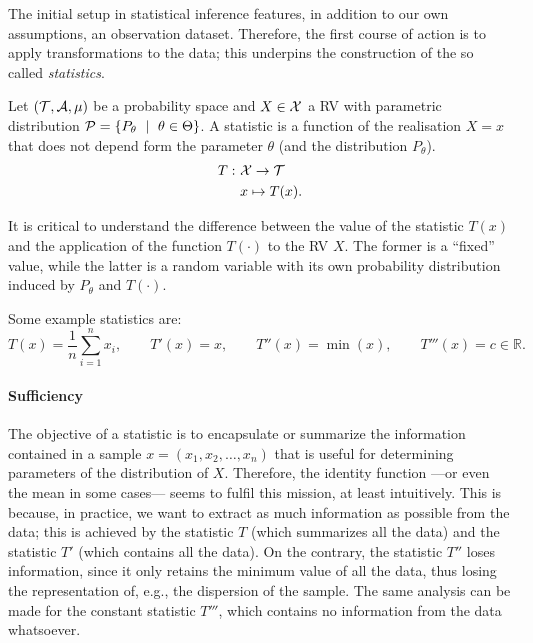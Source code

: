 The initial setup in statistical inference features, in addition to our own assumptions, an observation dataset. Therefore, the first course of action is to apply transformations to the data; this underpins the construction of the so called \emph{statistics}. 


\begin{definition}[Statistic]
\label{def:estadístico}
Let $({\mathcal T},{\mathcal A},\mu)$ be a probability space and $X\in{\mathcal X}$ a RV with parametric distribution $\cP = \{P_\theta\ \mid\ \theta\in\Theta\}$. A statistic is a function of the realisation $X=x$ that does not depend form the parameter $\theta$ (and the distribution $P_\theta$).
\begin{align}
\nonumber
	T:\ &{\mathcal X} \rightarrow {\mathcal T}\\
\nonumber
	&x\mapsto T(x).
\end{align} 

\end{definition}

\begin{remark}
It is critical to understand the difference between the value of the statistic $T(x)$ and the application of the function $T(\cdot)$ to the RV $X$. The former is a “fixed” value, while the latter is a random variable with its own probability distribution induced by $P_\theta$ and $T(\cdot)$. 
\end{remark}


Some example statistics are: 
\begin{equation}
\nonumber
	T(x) = \frac{1}{n}\sum_{i=1}^nx_i,\qquad T'(x) = x, \qquad T''(x) = \min(x), \qquad T'''(x) = c\in \mathbb{R}.
\end{equation}

\paragraph{Sufficiency}
The objective of a statistic is to encapsulate or summarize the information contained in a sample $x = (x_1,x_2,\ldots,x_n)$ that is useful for determining parameters of the distribution of $X$. Therefore, the identity function ---or even the mean in some cases--- seems to fulfil this mission, at least intuitively. This is because, in practice, we want to extract as much information as possible from the data; this is achieved by the statistic $T$ (which summarizes all the data) and the statistic $T'$ (which contains all the data). On the contrary, the statistic $T''$ loses information, since it only retains the minimum value of all the data, thus losing the representation of, e.g., the dispersion of the sample. The same analysis can be made for the constant statistic $T'''$, which contains no information from the data whatsoever.

